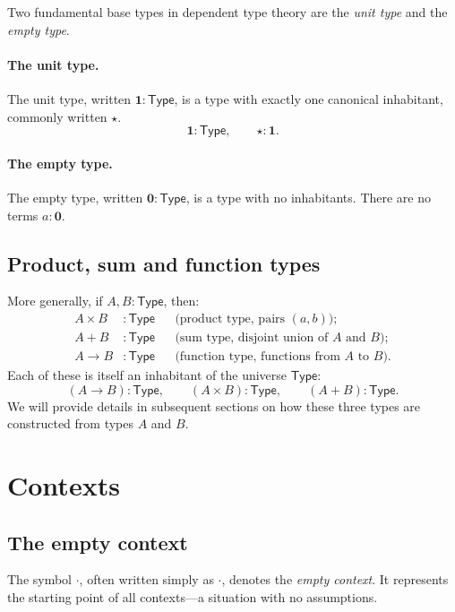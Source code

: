 \documentclass{article}
\newcommand{\Type}{\mathsf{Type}}
\newcommand{\emptyctx}{\cdot}              %
\newcommand{\ctx}{\mathsf{ctx}}            %
\begin{document}
Two fundamental base types in dependent type theory are the \emph{unit type} and the \emph{empty type}.  

\paragraph{The unit type.}
The unit type, written \(\mathbf{1} : \Type\), is a type with exactly one canonical inhabitant, commonly written \(\star\).
\[
\mathbf{1} : \Type, \qquad \star : \mathbf{1}.
\]

\paragraph{The empty type.}
The empty type, written \(\mathbf{0} : \Type\), is a type with no inhabitants.  
There are no terms \(a : \mathbf{0}\).  


\subsection*{Product, sum and function types}

More generally, if \(A,B : \Type\), then:
\[
\begin{aligned}
A \times B &:\Type &&\text{(product type, pairs \((a,b)\));}\\
A + B &:\Type &&\text{(sum type, disjoint union of \(A\) and \(B\));}\\
A \to B &:\Type &&\text{(function type, functions from \(A\) to \(B\)).}
\end{aligned}
\]
Each of these is itself an inhabitant of the universe \(\Type\):
\[
(A \to B) : \Type, \qquad (A \times B) : \Type, \qquad (A + B) : \Type.
\]
We will provide details in subsequent sections on how these three types are constructed from types $A$ and $B$.

\section{Contexts}

\subsection*{The empty context}
The symbol \(\emptyctx\), often written simply as \(\cdot\), denotes the \emph{empty context}.
It represents the starting point of all contexts---a situation with no assumptions.
\end{document}
